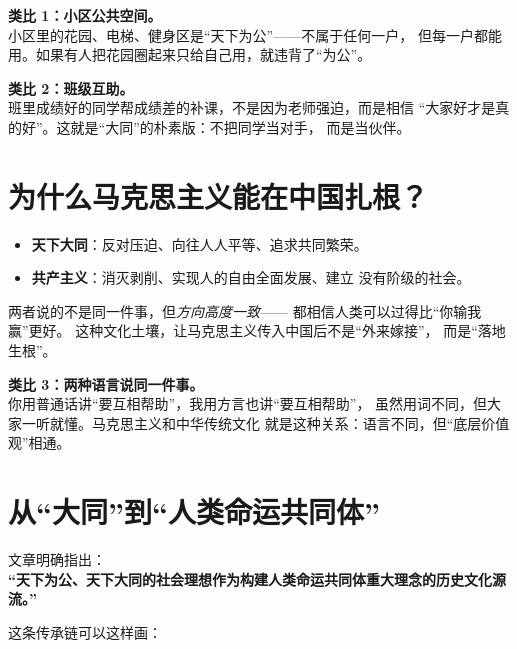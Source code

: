 \documentclass[11pt,a4paper]{ctexart}
\begin{document}
\begin{lifeblock}
\textbf{类比 1：小区公共空间。}\\
小区里的花园、电梯、健身区是``天下为公''——不属于任何一户，
但每一户都能用。如果有人把花园圈起来只给自己用，就违背了``为公''。

\textbf{类比 2：班级互助。}\\
班里成绩好的同学帮成绩差的补课，不是因为老师强迫，而是相信
``大家好才是真的好''。这就是``大同''的朴素版：不把同学当对手，
而是当伙伴。
\end{lifeblock}

\section{为什么马克思主义能在中国扎根？}

\begin{compareblock}
\begin{itemize}
  \item \textbf{天下大同}：反对压迫、向往人人平等、追求共同繁荣。
  \item \textbf{共产主义}：消灭剥削、实现人的自由全面发展、建立
        没有阶级的社会。
\end{itemize}
两者说的不是同一件事，但\emph{方向高度一致}——
都相信人类可以过得比``你输我赢''更好。
这种文化土壤，让马克思主义传入中国后不是``外来嫁接''，
而是``落地生根''。
\end{compareblock}

\begin{lifeblock}
\textbf{类比 3：两种语言说同一件事。}\\
你用普通话讲``要互相帮助''，我用方言也讲``要互相帮助''，
虽然用词不同，但大家一听就懂。马克思主义和中华传统文化
就是这种关系：语言不同，但``底层价值观''相通。
\end{lifeblock}

\section{从``大同''到``人类命运共同体''}

文章明确指出：\\
\textbf{``天下为公、天下大同的社会理想作为构建人类命运共同体重大理念的历史文化源流。''}

这条传承链可以这样画：

\begin{center}
\end{center}
\end{document}
